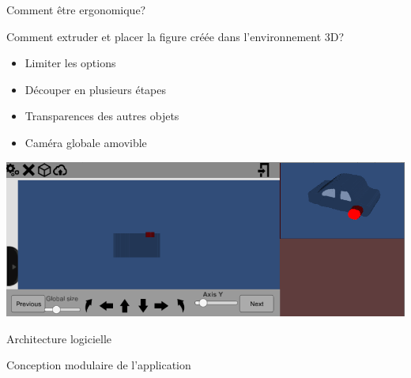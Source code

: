 \documentclass[a4paper,10pt]{beamer}
\begin{document}
		\begin{frame}{Comment être ergonomique?}
			
			Comment extruder et placer la figure créée dans l'environnement 3D?
			\begin{itemize}
				\item Limiter les options
				\item Découper en plusieurs étapes
				\item Transparences des autres objets
				\item Caméra globale amovible
			\end{itemize}
			
				\centerline{\includegraphics[scale=0.4]{images/Nono/img4.png}} 
			
			
		\end{frame}	
			
	
	\begin{frame}{Architecture logicielle} %
		\centerline{\huge Conception modulaire de l'application}
	\end{frame}
	
\end{document}
